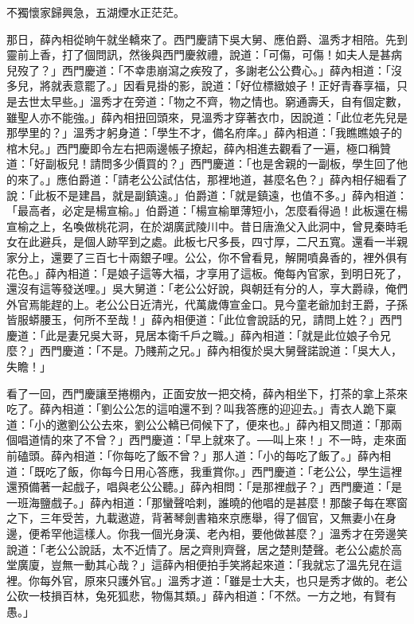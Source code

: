 不獨懷家歸興急，五湖煙水正茫茫。

那日，薛內相從晌午就坐轎來了。西門慶請下吳大舅、應伯爵、溫秀才相陪。先到靈前上香，打了個問訊，然後與西門慶敘禮，說道：「可傷，可傷！如夫人是甚病兒歿了？」西門慶道：「不幸患崩瀉之疾歿了，多謝老公公費心。」薛內相道：「沒多兒，將就表意罷了。」因看見掛的影，說道：「好位標緻娘子！正好青春享福，只是去世太早些。」溫秀才在旁道：「物之不齊，物之情也。窮通壽夭，自有個定數，雖聖人亦不能強。」薛內相扭回頭來，見溫秀才穿著衣巾，因說道：「此位老先兒是那學里的？」溫秀才躬身道：「學生不才，備名府庠。」薛內相道：「我瞧瞧娘子的棺木兒。」西門慶即令左右把兩邊帳子撩起，薛內相進去觀看了一遍，極口稱贊道：「好副板兒！請問多少價買的？」西門慶道：「也是舍親的一副板，學生回了他的來了。」應伯爵道：「請老公公試估估，那裡地道，甚麼名色？」薛內相仔細看了說：「此板不是建昌，就是副鎮遠。」伯爵道：「就是鎮遠，也值不多。」薛內相道：「最高者，必定是楊宣榆。」伯爵道：「楊宣榆單薄短小，怎麼看得過！此板還在楊宣榆之上，名喚做桃花洞，在於湖廣武陵川中。昔日唐漁父入此洞中，曾見秦時毛女在此避兵，是個人跡罕到之處。此板七尺多長，四寸厚，二尺五寬。還看一半親家分上，還要了三百七十兩銀子哩。公公，你不曾看見，解開噴鼻香的，裡外俱有花色。」薛內相道：「是娘子這等大福，才享用了這板。俺每內官家，到明日死了，還沒有這等發送哩。」吳大舅道：「老公公好說，與朝廷有分的人，享大爵祿，俺們外官焉能趕的上。老公公日近清光，代萬歲傳宣金口。見今童老爺加封王爵，子孫皆服蟒腰玉，何所不至哉！」薛內相便道：「此位會說話的兄，請問上姓？」西門慶道：「此是妻兄吳大哥，見居本衛千戶之職。」薛內相道：「就是此位娘子令兄麼？」西門慶道：「不是。乃賤荊之兄。」薛內相復於吳大舅聲諾說道：「吳大人，失瞻！」

看了一回，西門慶讓至捲棚內，正面安放一把交椅，薛內相坐下，打茶的拿上茶來吃了。薛內相道：「劉公公怎的這咱還不到？叫我答應的迎迎去。」青衣人跪下稟道：「小的邀劉公公去來，劉公公轎已伺候下了，便來也。」薛內相又問道：「那兩個唱道情的來了不曾？」西門慶道：「早上就來了。──叫上來！」不一時，走來面前磕頭。薛內相道：「你每吃了飯不曾？」那人道：「小的每吃了飯了。」薛內相道：「既吃了飯，你每今日用心答應，我重賞你。」西門慶道：「老公公，學生這裡還預備著一起戲子，唱與老公公聽。」薛內相問：「是那裡戲子？」西門慶道：「是一班海鹽戲子。」薛內相道：「那蠻聲哈剌，誰曉的他唱的是甚麼！那酸子每在寒窗之下，三年受苦，九載遨遊，背著琴劍書箱來京應舉，得了個官，又無妻小在身邊，便希罕他這樣人。你我一個光身漢、老內相，要他做甚麼？」溫秀才在旁邊笑說道：「老公公說話，太不近情了。居之齊則齊聲，居之楚則楚聲。老公公處於高堂廣廈，豈無一動其心哉？」這薛內相便拍手笑將起來道：「我就忘了溫先兒在這裡。你每外官，原來只護外官。」溫秀才道：「雖是士大夫，也只是秀才做的。老公公砍一枝損百林，兔死狐悲，物傷其類。」薛內相道：「不然。一方之地，有賢有愚。」

